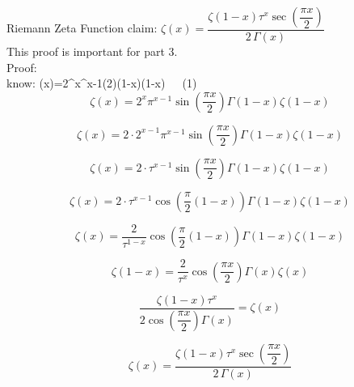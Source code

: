 \documentclass[12pt]{article}
\begin{document}
\pagebreak
\begin{section}{Riemann Zeta Function}
	claim: $\zeta(x)=\dfrac{\zeta(1-x)\tau^x\sec\left(\dfrac{\pi x}2\right)}{2\,\Gamma(x)}$\\
	This proof is important for part 3.\\
	Proof:\\
	know: \zeta(x)=2^x\pi^{x-1}\sin\left(2\right)\Gamma(1-x)\zeta(1-x)~~~(1)\\

	\begin{equation}
		\zeta(x)=2^x\pi^{x-1}\sin\left(\dfrac{\pi x}2\right)\Gamma\left(1-x\right)\zeta\left(1-x\right)
	\end{equation}

	\begin{equation}
		\zeta(x)=2\cdot2^{x-1}\pi^{x-1}\sin\left(\dfrac{\pi x}2\right)\Gamma(1-x)\zeta(1-x)
	\end{equation}

	\begin{equation}
		\zeta(x)=2\cdot\tau^{x-1}\sin\left(\dfrac{\pi x}2\right)\Gamma(1-x)\zeta(1-x)
	\end{equation}

	\begin{equation}
		\zeta(x)=2\cdot\tau^{x-1}\cos\left(\dfrac\pi2(1-x)\right)\Gamma(1-x)\zeta(1-x)
	\end{equation}

	\begin{equation}
		\zeta(x)=\dfrac2{\tau^{1-x}}\cos\left(\dfrac\pi2(1-x)\right)\Gamma(1-x)\zeta(1-x)
	\end{equation}

	\begin{equation}
		\zeta(1-x)=\dfrac2{\tau^x}\cos\left(\dfrac{\pi x}2\right)\Gamma(x)\zeta(x)
	\end{equation}

	\begin{equation}
		\dfrac{\zeta(1-x)\tau^x}{2\cos\left(\dfrac{\pi x}2\right)\Gamma(x)}=\zeta(x)
	\end{equation}

	\begin{equation}
		\zeta(x)=\dfrac{\zeta(1-x)\tau^x\sec\left(\dfrac{\pi x}2\right)}{2\,\Gamma(x)}
	\end{equation}

	\noindent\blacksquare
\end{section}
\end{document}
